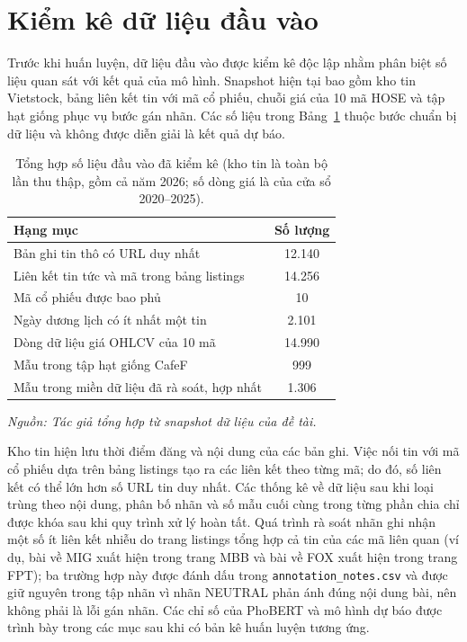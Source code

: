 \documentclass[12pt, a4paper, oneside]{report}
\begin{document}
\section{Kiểm kê dữ liệu đầu vào}
\label{sec:kq-snapshot}

Trước khi huấn luyện, dữ liệu đầu vào được kiểm kê độc lập nhằm phân biệt số liệu quan sát
với kết quả của mô hình. Snapshot hiện tại bao gồm kho tin Vietstock, bảng liên kết tin
với mã cổ phiếu, chuỗi giá của 10 mã HOSE và tập hạt giống phục vụ bước gán nhãn.
Các số liệu trong Bảng~\ref{tab:kq-snapshot} thuộc bước chuẩn bị dữ liệu và không
được diễn giải là kết quả dự báo.

\begin{table}[H]
  \centering
  \caption{Tổng hợp số liệu đầu vào đã kiểm kê (kho tin là toàn bộ lần thu thập, gồm cả năm 2026; số dòng giá là của cửa sổ 2020--2025).}
  \label{tab:kq-snapshot}
  \begin{tabular}{p{8.8cm} c}
    \toprule
    Hạng mục & Số lượng \\
    \midrule
    Bản ghi tin thô có URL duy nhất & 12.140 \\
    Liên kết tin tức và mã trong bảng listings & 14.256 \\
    Mã cổ phiếu được bao phủ & 10 \\
    Ngày dương lịch có ít nhất một tin & 2.101 \\
    Dòng dữ liệu giá OHLCV của 10 mã & 14.990 \\
    Mẫu trong tập hạt giống CafeF & 999 \\
    Mẫu trong miền dữ liệu đã rà soát, hợp nhất & 1.306 \\
    \bottomrule
  \end{tabular}
\noindent\textit{Nguồn: Tác giả tổng hợp từ snapshot dữ liệu của đề tài.}
\end{table}

Kho tin hiện lưu thời điểm đăng và nội dung của các bản ghi. Việc nối tin với
mã cổ phiếu dựa trên bảng listings tạo ra các liên kết theo từng mã; do đó, số liên kết
có thể lớn hơn số URL tin duy nhất. Các thống kê về dữ liệu sau khi loại trùng theo nội dung,
phân bố nhãn và số mẫu cuối cùng trong từng phần chia chỉ được khóa sau khi quy trình xử lý hoàn tất.
Quá trình rà soát nhãn ghi nhận một số ít liên kết nhiễu do trang listings tổng hợp cả tin của
các mã liên quan (ví dụ, bài về MIG xuất hiện trong trang MBB và bài về FOX xuất hiện trong trang
FPT); ba trường hợp này được đánh dấu trong \texttt{annotation\_notes.csv} và được giữ
nguyên trong tập nhãn vì nhãn NEUTRAL phản ánh đúng nội dung bài, nên không phải là lỗi
gán nhãn.
Các chỉ số của PhoBERT và mô hình dự báo được trình bày trong các mục sau khi có bản kê
huấn luyện tương ứng.
\end{document}
